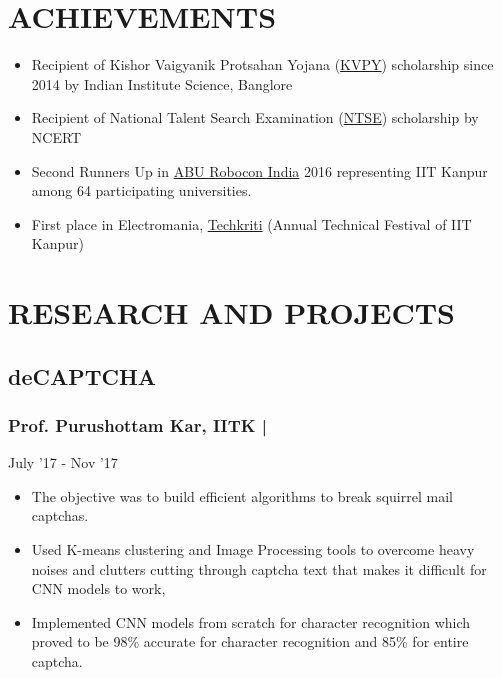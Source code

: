 \documentclass[letterpaper]{twentysecondcv} %
\begin{document}
\section{ACHIEVEMENTS}
\begin{itemize}
	\item Recipient of Kishor Vaigyanik Protsahan Yojana (\href{http://www.kvpy.iisc.ernet.in/main/index.htm}{KVPY}) scholarship since 2014 by Indian Institute Science, Banglore
	\item Recipient of National Talent Search Examination (\href{http://www.ncert.nic.in/programmes/talent_exam/index_talent.html}{NTSE}) scholarship by NCERT 
	\item Second Runners Up in \href{http://www.roboconindia.com/}{ABU Robocon India} 2016 representing IIT Kanpur among 64 participating universities.
	\item First place in Electromania, \href{https://techkriti.org/}{Techkriti} (Annual Technical Festival of IIT Kanpur)
\end{itemize}
\section{RESEARCH AND PROJECTS}
\subsection{deCAPTCHA}\subsubsection{Prof. Purushottam Kar, IITK | } \hfill{} July '17 - Nov '17

\begin{itemize}
\item The objective was to build efficient algorithms to break squirrel mail captchas.
\item Used K-means clustering and Image Processing tools to overcome heavy noises and clutters cutting through captcha text that makes it difficult for CNN models to work,
\item Implemented CNN models from scratch for character recognition which proved to be 98\% accurate for character recognition and 85\% for entire captcha.
\end{itemize}
\end{document}
